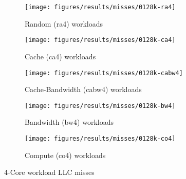 \begin{figure}
    \centering
    \begin{subfigure}[b]{\textwidth}
            \texttt{[image: figures/results/misses/0128k-ra4]}
            \caption{Random (ra4) workloads}
            \label{fig:results:4core:misses:random}
    \end{subfigure}

    \begin{subfigure}[b]{0.5\textwidth}
            \texttt{[image: figures/results/misses/0128k-ca4]}
            \caption{Cache (ca4) workloads}
            \label{fig:results:4core:misses:cache}
    \end{subfigure}%
    \begin{subfigure}[b]{0.5\textwidth}
            \texttt{[image: figures/results/misses/0128k-cabw4]}
            \caption{Cache-Bandwidth (cabw4) workloads}
            \label{fig:results:4core:misses:cache-bw}
    \end{subfigure}

    \begin{subfigure}[b]{0.5\textwidth}
            \texttt{[image: figures/results/misses/0128k-bw4]}
            \caption{Bandwidth (bw4) workloads}
            \label{fig:results:4core:misses:bw}
    \end{subfigure}%
    \begin{subfigure}[b]{0.5\textwidth}
            \texttt{[image: figures/results/misses/0128k-co4]}
            \caption{Compute (co4) workloads}
            \label{fig:results:4core:misses:co}
    \end{subfigure}%

    \caption{4-Core workload LLC misses}\label{fig:results:4core:misses}
\end{figure}


